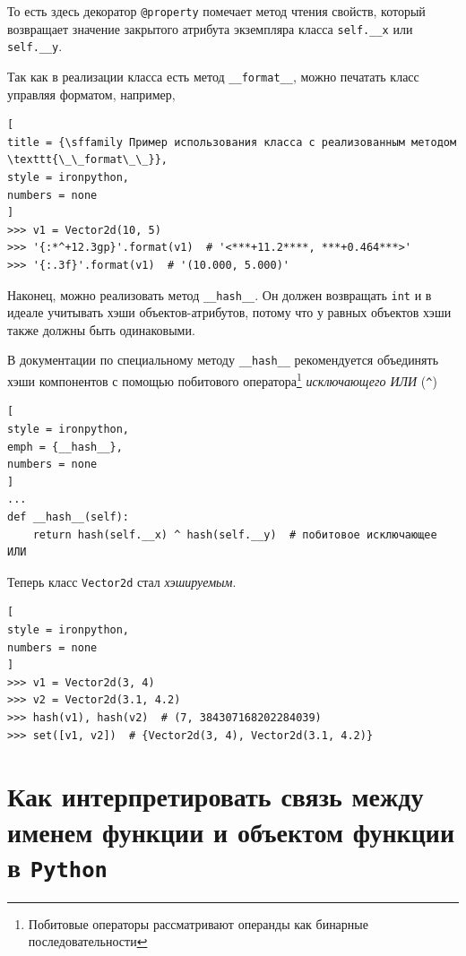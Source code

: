 \documentclass[%
	11pt,
	a4paper,
	utf8,
		]{article}
\begin{document}
То есть здесь декоратор \texttt{@property} помечает метод чтения свойств, который возвращает значение закрытого атрибута экземпляра класса \texttt{self.\_\_x} или \texttt{self.\_\_y}.

Так как в реализации класса есть метод \texttt{\_\_format\_\_}, можно печатать класс управляя форматом, например,

\begin{lstlisting}[
title = {\sffamily Пример использования класса с реализованным методом \texttt{\_\_format\_\_}},
style = ironpython,
numbers = none
]
>>> v1 = Vector2d(10, 5)
>>> '{:*^+12.3gp}'.format(v1)  # '<***+11.2****, ***+0.464***>'
>>> '{:.3f}'.format(v1)  # '(10.000, 5.000)'
\end{lstlisting}

Наконец, можно реализовать метод \texttt{\_\_hash\_\_}. Он должен возвращать \texttt{int} и в идеале учитывать хэши объектов-атрибутов, потому что у равных объектов хэши также должны быть одинаковыми.

В документации по специальному методу \texttt{\_\_hash\_\_} рекомендуется объединять хэши компонентов с помощью побитового оператора\footnote{Побитовые операторы рассматривают операнды как бинарные последовательности} \emph{исключающего ИЛИ} (\texttt{\^}) \cite[]{ramalho:python-2016}

\begin{lstlisting}[
style = ironpython,
emph = {__hash__},
numbers = none
]
...
def __hash__(self):
    return hash(self.__x) ^ hash(self.__y)  # побитовое исключающее ИЛИ
\end{lstlisting}

Теперь класс \texttt{Vector2d} стал \emph{хэшируемым}.

\begin{lstlisting}[
style = ironpython,
numbers = none
]
>>> v1 = Vector2d(3, 4)
>>> v2 = Vector2d(3.1, 4.2)
>>> hash(v1), hash(v2)  # (7, 384307168202284039)
>>> set([v1, v2])  # {Vector2d(3, 4), Vector2d(3.1, 4.2)}
\end{lstlisting}


\section{Как интерпретировать связь между именем функции и объектом функции в \texttt{Python}}
\end{document}
